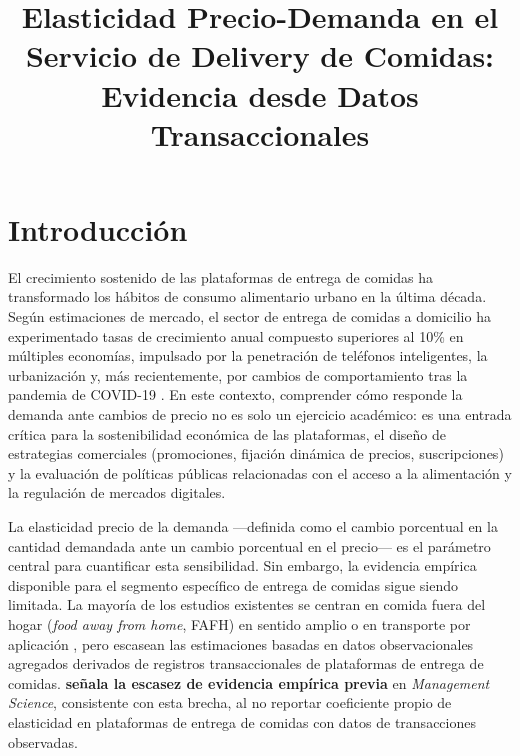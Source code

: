 \documentclass[doc, a4paper, biblatex, floatsintext, longtable, babel]{apa7}
\title{Elasticidad Precio-Demanda en el Servicio de Delivery de Comidas: Evidencia desde Datos Transaccionales}
\begin{document}
\maketitle

\section{Introducci\'on}
\label{sec:introduccion}

El crecimiento sostenido de las plataformas de entrega de comidas ha transformado los h\'abitos de consumo alimentario urbano en la \'ultima d\'ecada. Seg\'un estimaciones de mercado, el sector de entrega de comidas a domicilio ha experimentado tasas de crecimiento anual compuesto superiores al 10\% en m\'ultiples econom\'ias, impulsado por la penetraci\'on de tel\'efonos inteligentes, la urbanizaci\'on y, m\'as recientemente, por cambios de comportamiento tras la pandemia de COVID-19 \parencite{statista2024}. En este contexto, comprender c\'omo responde la demanda ante cambios de precio no es solo un ejercicio acad\'emico: es una entrada cr\'itica para la sostenibilidad econ\'omica de las plataformas, el dise\~no de estrategias comerciales (promociones, fijaci\'on din\'amica de precios, suscripciones) y la evaluaci\'on de pol\'iticas p\'ublicas relacionadas con el acceso a la alimentaci\'on y la regulaci\'on de mercados digitales.

La elasticidad precio de la demanda ---definida como el cambio porcentual en la cantidad demandada ante un cambio porcentual en el precio--- es el par\'ametro central para cuantificar esta sensibilidad. Sin embargo, la evidencia emp\'irica disponible para el segmento espec\'ifico de entrega de comidas sigue siendo limitada. La mayor\'ia de los estudios existentes se centran en comida fuera del hogar (\textit{food away from home}, FAFH) en sentido amplio \parencite{andreyeva2010, damayanti2023} o en transporte por aplicaci\'on \parencite{christensen2021}, pero escasean las estimaciones basadas en datos observacionales agregados derivados de registros transaccionales de plataformas de entrega de comidas. \textcite{li2025} \textbf{se\~nala la escasez de evidencia emp\'irica previa} en \textit{Management Science}, consistente con esta brecha, al no reportar coeficiente propio de elasticidad en plataformas de entrega de comidas con datos de transacciones observadas.
\end{document}
